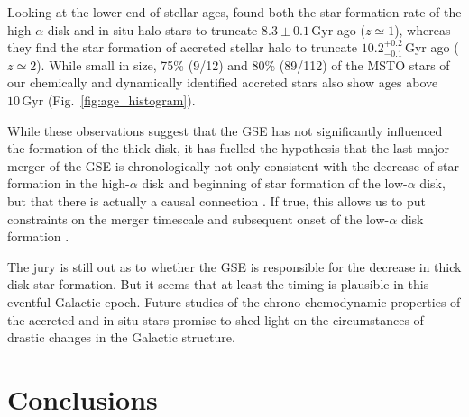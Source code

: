 \documentclass[fleqn,usenatbib]{mnras}
\newcommand{\Gyr}{\,\mathrm{Gyr}}	%
\begin{document}
Looking at the lower end of stellar ages, \citet{Bonaca2020} found both the star formation rate of the high-$\alpha$ disk and in-situ halo stars to truncate $8.3 \pm 0.1 \Gyr$ ago ($z \simeq 1$), whereas they find the star formation of accreted stellar halo to truncate $10.2_{-0.1}^{+0.2} \Gyr$ ago ($z \simeq 2$). While small in size, 75\% (9/12) and 80\% (89/112) of the MSTO stars of our chemically and dynamically identified accreted stars also show ages above $10\Gyr$ (Fig.~\ref{fig:age_histogram}).

While these observations suggest that the GSE has not significantly influenced the formation of the thick disk, it has fuelled the hypothesis that the last major merger of the GSE is chronologically not only consistent with the decrease of star formation in the high-$\alpha$ disk \citep{Bonaca2020} and beginning of star formation of the low-$\alpha$ disk, but that there is actually a causal connection \citep[see e.g.][]{Buck2020}. If true, this allows us to put constraints on the merger timescale and subsequent onset of the low-$\alpha$ disk formation \citep[e.g.][]{Wyse2001,DiMatteo2019,Belokurov2020}. 

The jury is still out as to whether the GSE is responsible for the decrease in thick disk star formation. But it seems that at least the timing is plausible in this eventful Galactic epoch. Future studies of the chrono-chemodynamic properties of the accreted and in-situ stars promise to shed light on the circumstances of drastic changes in the Galactic structure.

\section{Conclusions} \label{sec:conclusions}
\end{document}
